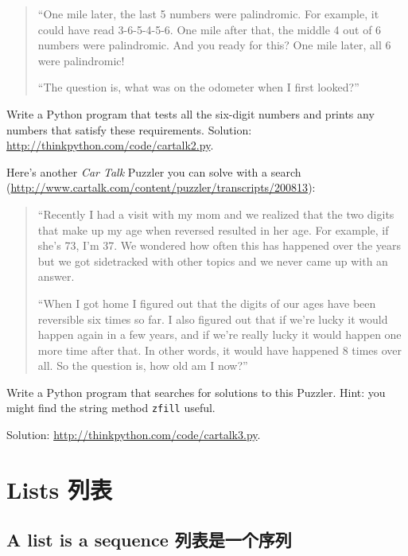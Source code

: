 \documentclass[10pt]{book}
\begin{document}
\begin{CJK}{UTF8}{gbsn}
\begin{exercise}
\begin{quote}
``One mile later, the last 5 numbers were palindromic. For example, it
could have read 3-6-5-4-5-6.  One mile after that, the middle 4 out of
6 numbers were palindromic.  And you ready for this? One mile later,
all 6 were palindromic!

``The question is, what was on the odometer when I first looked?''
\end{quote}

Write a Python program that tests all the six-digit numbers and prints
any numbers that satisfy these requirements.  
Solution: \url{http://thinkpython.com/code/cartalk2.py}.

\end{exercise}


\begin{exercise}
Here's another {\em Car Talk} Puzzler you can solve with a
search (\url{http://www.cartalk.com/content/puzzler/transcripts/200813}):

\begin{quote}
``Recently I had a visit with my mom and we realized that
the two digits that make up my age when reversed resulted in her
age. For example, if she's 73, I'm 37. We wondered how often this has
happened over the years but we got sidetracked with other topics and
we never came up with an answer.

``When I got home I figured out that the digits of our ages have been
reversible six times so far. I also figured out that if we're lucky it
would happen again in a few years, and if we're really lucky it would
happen one more time after that. In other words, it would have
happened 8 times over all. So the question is, how old am I now?''

\end{quote}

Write a Python program that searches for solutions to this Puzzler.
Hint: you might find the string method {\tt zfill} useful.

Solution: \url{http://thinkpython.com/code/cartalk3.py}.

\end{exercise}



\chapter{Lists 列表}

\section{A list is a sequence 列表是一个序列}
\label{sequence}


\end{CJK}
\end{document}
